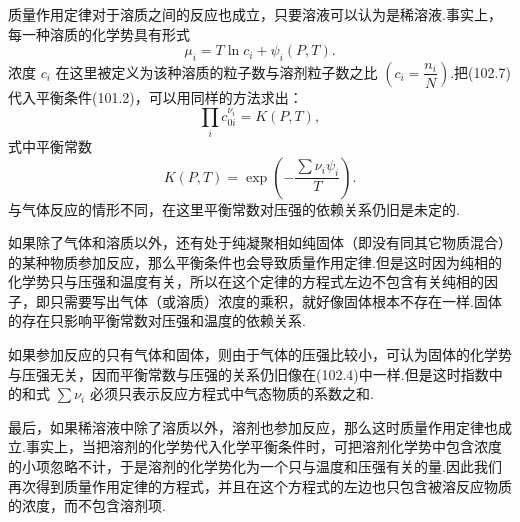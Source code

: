 质量作用定律对于溶质之间的反应也成立，只要溶液可以认为是稀溶液.事实上，每一种溶质的化学势具有形式
\begin{equation}
  \mu_i=T\ln c_i+\psi_i(P,T).
\end{equation}
浓度 $c_i$ 在这里被定义为该种溶质的粒子数与溶剂粒子数之比 $\left(c_i=\dfrac{n_i}{N}\right)$.把(102.7)代入平衡条件(101.2)，可以用同样的方法求出：
\begin{equation}
  \prod_ic_{0i}^{\nu_i}=K(P,T),
\end{equation}
式中平衡常数
\begin{equation}
  K(P,T)=\exp\left(-\frac{\sum\nu_i\psi_i}{T}\right).
\end{equation}
与气体反应的情形不同，在这里平衡常数对压强的依赖关系仍旧是未定的.

如果除了气体和溶质以外，还有处于纯凝聚相如纯固体（即没有同其它物质混合）的某种物质参加反应，那么平衡条件也会导致质量作用定律.但是这时因为纯相的化学势只与压强和温度有关，所以在这个定律的方程式左边不包含有关纯相的因子，即只需要写出气体（或溶质）浓度的乘积，就好像固体根本不存在一样.固体的存在只影响平衡常数对压强和温度的依赖关系.

如果参加反应的只有气体和固体，则由于气体的压强比较小，可认为固体的化学势与压强无关，因而平衡常数与压强的关系仍旧像在(102.4)中一样.但是这时指数中的和式 $\sum\nu_i$ 必须只表示反应方程式中气态物质的系数之和.

最后，如果稀溶液中除了溶质以外，溶剂也参加反应，那么这时质量作用定律也成立.事实上，当把溶剂的化学势代入化学平衡条件时，可把溶剂化学势中包含浓度的小项忽略不计，于是溶剂的化学势化为一个只与温度和压强有关的量.因此我们再次得到质量作用定律的方程式，并且在这个方程式的左边也只包含被溶反应物质的浓度，而不包含溶剂项.

